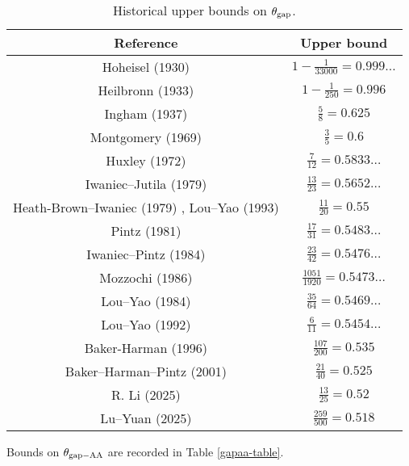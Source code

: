 \begin{table}[ht]
    \caption{Historical upper bounds on $\theta_{\mathrm{gap}}$.}
    \centering
    \renewcommand{\arraystretch}{1.2}
    \begin{tabular}{|c|c|}
    \hline
    Reference & Upper bound \\
    \hline
    Hoheisel (1930) \cite{hoheisel_1930} & $1 - \frac{1}{33000} = 0.999\dots$ \\
    \hline
    Heilbronn (1933) \cite{heilbronn_1933} & $1 - \frac{1}{250} = 0.996$ \\
    \hline
    Ingham (1937) \cite{ingham_difference_1937} & $\frac{5}{8} = 0.625$ \\
    \hline
    Montgomery (1969) \cite{montgomery_1969} & $\frac{3}{5} = 0.6$ \\
    \hline
    Huxley (1972) \cite{Huxley} & $\frac{7}{12} = 0.5833\dots$ \\
    \hline
    Iwaniec--Jutila (1979)\cite{iwaniec-jutila} & $\frac{13}{23} = 0.5652\dots$ \\
    \hline
    Heath-Brown--Iwaniec (1979) \cite{heathbrown_iwaniec_1979}, Lou--Yao (1993) \cite{lou_yao_number_1993}& $\frac{11}{20} = 0.55$ \\
    \hline
    Pintz (1981) \cite{pintz_1981} & $\frac{17}{31} = 0.5483\dots$ \\
    \hline
    Iwaniec--Pintz (1984) \cite{iwaniec-pintz} & $\frac{23}{42} = 0.5476\dots$\\
    \hline
    Mozzochi (1986) \cite{mozzochi-consecutive} & $\frac{1051}{1920} = 0.5473\dots$ \\
    \hline
    Lou--Yao (1984) \cite{LouYao3564} & $\frac{35}{64} = 0.5469\dots$\\
    \hline
    Lou--Yao (1992) \cite{lou-yao-chebychev} & $\frac{6}{11} = 0.5454\dots$\\
    \hline
    Baker-Harman (1996) \cite{baker-harman} & $\frac{107}{200} = 0.535$\\
    \hline
    Baker--Harman--Pintz (2001) \cite{baker-harman-pintz} & $\frac{21}{40} = 0.525$ \\
    \hline
    R. Li (2025) \cite{li_number_2025} & $\frac{13}{25} = 0.52$\\
    \hline
    Lu--Yuan (2025) \cite{lu_yuan_primes_2025} & $\frac{259}{500} = 0.518$\\
    \hline
    \end{tabular}
    \end{table}\label{gapmax-table}

Bounds on $\theta_{\mathrm{gap-AA}}$ are recorded in Table \ref{gapaa-table}.

